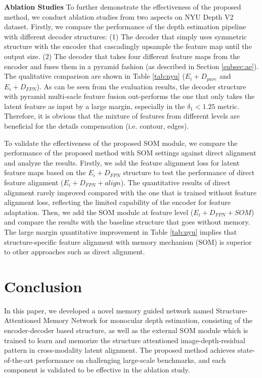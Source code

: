 \documentclass[letterpaper]{article} \usepackage{aaai20}  \usepackage{times}  \usepackage{helvet} \usepackage{courier}  \usepackage{graphicx} \frenchspacing  \setlength{\pdfpagewidth}{8.5in}  \setlength{\pdfpageheight}{11in}  \usepackage{epsfig}
\begin{document}
    \textbf{Ablation Studies} \hspace{0.3cm} To further demonstrate the effectiveness of the proposed method, we conduct ablation studies from two aspects on NYU Depth V2 dataset. Firstly, we compare the performance of the depth estimation pipeline with different decoder structures: (1) The decoder that simply uses symmetric structure with the encoder that cascadingly upsample the feature map until the output size. (2) The decoder that takes four different feature maps from the encoder and fuses them in a pyramid fashion (as described in Section \ref{subsec:ae}). The qualitative comparison are shown in Table \ref{tab:nyu} ($E_i+D_{pure}$ and $E_i+D_{FPN}$). As can be seen from the evaluation results, the decoder structure with pyramid multi-sacle feature fusion out-performs the one that only takes the latent feature as input by a large margin, especially in the $\delta
    _1 < 1.25$ metric. Therefore, it is obvious that the mixture of features from different levels are beneficial for the details compensation (i.e. contour, edges).
  
    To validate the effectiveness of the proposed SOM module, we compare the performance of the proposed method with SOM settings against direct alignment and analyze the results. Firstly, we add the feature alignment loss for latent feature maps based on the $E_i+D_{FPN}$ structure to test the performance of direct feature alignment ($E_i + D_{FPN} + align$). The quantitative results of direct alignment rarely improved compared with the one that is trained without feature alignment loss, reflecting the limited capability of the encoder for feature adaptation. Then, we add the SOM module at feature level ($E_i + D_{FPN} + SOM$) and compare the results with the baseline structure that goes without memory. The large margin quantitative improvement in Table \ref{tab:nyu} implies that structure-specific feature alignment with memory mechanism (SOM) is superior to other approaches such as direct alignment. 
    
    \section{Conclusion}
    In this paper, we developed a novel memory guided network named Structure-Attentioned Memory Network for monocular depth estimation, consisting of the encoder-decoder based structure, as well as the external SOM module which is trained to learn and memorize the structure attentioned image-depth-residual pattern in cross-modality latent alignment. The proposed method achieves state-of-the-art performance on challenging large-scale benchmarks, and each component is validated to be effective in the ablation study. 
    
    
    
    
    
\end{document}
